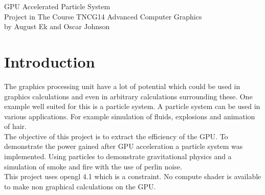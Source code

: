 \documentclass[report]{vgtc}
\begin{document}
\large
	\begin{titlepage}
		\begin{center} 
			{\Huge GPU Accelerated Particle System} \\[1cm]

			{\LARGE Project in The Course TNCG14 Advanced Computer Graphics} \\[0.4cm]
			{\LARGE by August Ek and Oscar Johnson}
		\end{center}
	\end{titlepage}
	
\begin{abstract}
\\The aim of this project was to create a particle system mainly accelerated by the GPU. The system would then be used to render different effects. The system was accelerated using instance rendering and transform feedback leading to a huge performance gain. The particle system created was used to render different visualizations such as smoke, fire and rigid objects colliding with planes.   
\end{abstract}

\section{Introduction}
The graphics processing unit have a lot of potential which could be used in graphics calculations and even in arbitrary calculations surrounding these. One example well suited for this is a particle system. A particle system can be used in various applications. For example simulation of fluids, explosions and animation of hair. 
\\
The objective of this project is to extract the efficiency of the GPU. To demonstrate the power gained after GPU acceleration a particle system was implemented. Using particles to demonstrate gravitational physics and a simulation of smoke and fire with the use of perlin noise.
\\
This project uses opengl 4.1 which is a constraint. No compute shader is available to make non graphical calculations on the GPU. 
\end{document}
